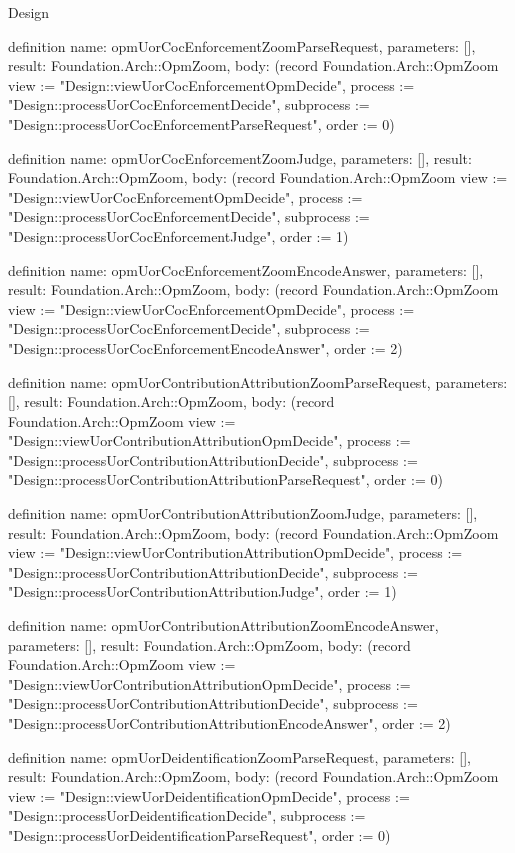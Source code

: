 \begin{lexlean}{Design}
\begin{semanticmodule}
definition{
  name: opmUorCocEnforcementZoomParseRequest,
  parameters: [],
  result: Foundation.Arch::OpmZoom,
  body: (record Foundation.Arch::OpmZoom {view := "Design::viewUorCocEnforcementOpmDecide", process := "Design::processUorCocEnforcementDecide", subprocess := "Design::processUorCocEnforcementParseRequest", order := 0})
}

definition{
  name: opmUorCocEnforcementZoomJudge,
  parameters: [],
  result: Foundation.Arch::OpmZoom,
  body: (record Foundation.Arch::OpmZoom {view := "Design::viewUorCocEnforcementOpmDecide", process := "Design::processUorCocEnforcementDecide", subprocess := "Design::processUorCocEnforcementJudge", order := 1})
}

definition{
  name: opmUorCocEnforcementZoomEncodeAnswer,
  parameters: [],
  result: Foundation.Arch::OpmZoom,
  body: (record Foundation.Arch::OpmZoom {view := "Design::viewUorCocEnforcementOpmDecide", process := "Design::processUorCocEnforcementDecide", subprocess := "Design::processUorCocEnforcementEncodeAnswer", order := 2})
}

definition{
  name: opmUorContributionAttributionZoomParseRequest,
  parameters: [],
  result: Foundation.Arch::OpmZoom,
  body: (record Foundation.Arch::OpmZoom {view := "Design::viewUorContributionAttributionOpmDecide", process := "Design::processUorContributionAttributionDecide", subprocess := "Design::processUorContributionAttributionParseRequest", order := 0})
}

definition{
  name: opmUorContributionAttributionZoomJudge,
  parameters: [],
  result: Foundation.Arch::OpmZoom,
  body: (record Foundation.Arch::OpmZoom {view := "Design::viewUorContributionAttributionOpmDecide", process := "Design::processUorContributionAttributionDecide", subprocess := "Design::processUorContributionAttributionJudge", order := 1})
}

definition{
  name: opmUorContributionAttributionZoomEncodeAnswer,
  parameters: [],
  result: Foundation.Arch::OpmZoom,
  body: (record Foundation.Arch::OpmZoom {view := "Design::viewUorContributionAttributionOpmDecide", process := "Design::processUorContributionAttributionDecide", subprocess := "Design::processUorContributionAttributionEncodeAnswer", order := 2})
}

definition{
  name: opmUorDeidentificationZoomParseRequest,
  parameters: [],
  result: Foundation.Arch::OpmZoom,
  body: (record Foundation.Arch::OpmZoom {view := "Design::viewUorDeidentificationOpmDecide", process := "Design::processUorDeidentificationDecide", subprocess := "Design::processUorDeidentificationParseRequest", order := 0})
}


\end{semanticmodule}
\end{lexlean}
